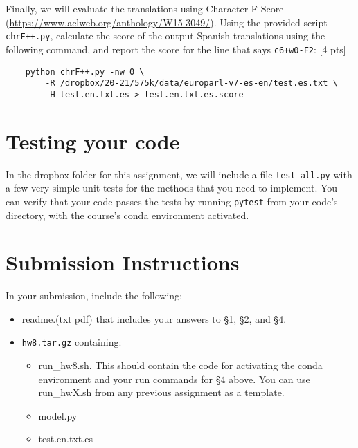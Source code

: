 \documentclass[11pt]{article}
\begin{document}
\vspace{2em}
 Finally, we will evaluate the translations using Character F-Score (\url{https://www.aclweb.org/anthology/W15-3049/}). Using the provided script \texttt{chrF++.py}, calculate the score of the output Spanish translations using the following command, and report the score for the line that says \texttt{c6+w0-F2}: \hfill [4 pts]
\begin{lstlisting}
    python chrF++.py -nw 0 \ 
        -R /dropbox/20-21/575k/data/europarl-v7-es-en/test.es.txt \
        -H test.en.txt.es > test.en.txt.es.score
\end{lstlisting}

\section{Testing your code}

In the dropbox folder for this assignment, we will include a file \texttt{test\_all.py} with a few very simple unit tests for the methods that you need to implement.  You can verify that your code passes the tests by running \texttt{pytest} from your code's directory, with the course's conda environment activated.


\section*{Submission Instructions}

In your submission, include the following:
\begin{itemize}
  \item readme.(txt$\mid$pdf) that includes your answers to \S1, \S2, and \S4. 
  \item \texttt{hw8.tar.gz} containing:
  \begin{itemize}
    \item run\_hw8.sh.  This should contain the code for activating the conda environment and your run commands for \S4 above.  You can use run\_hwX.sh from any previous assignment as a template.
    \item model.py
    \item test.en.txt.es
    \end{itemize}
\end{itemize}
\end{document}
